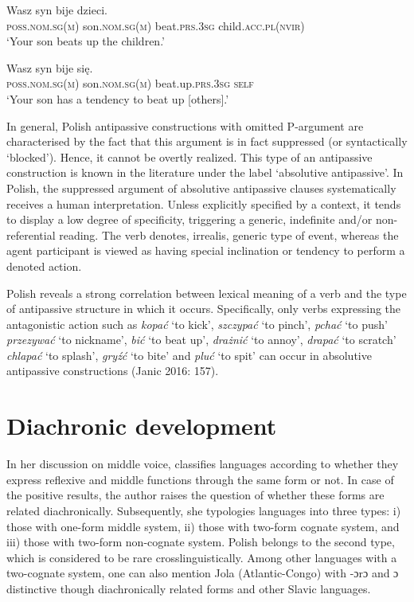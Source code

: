 \documentclass[output=paper]{langscibook}
\begin{document}
\ea \label{ex:Janic:59}
\ea \label{ex:Janic:59a}
\gll Wasz  syn bije dzieci.\\
	 \textsc{poss.nom.sg(m)} son.\textsc{nom.sg(m)}	beat.\textsc{prs.3sg}	child.\textsc{acc.pl(nvir)}\\
\glt ‘Your son beats up the children.’

\ex \label{ex:Janic:59b}
\gll Wasz  syn  bije  się.\\
 	\textsc{poss.nom.sg(m)}	 son.\textsc{nom.sg(m)}	beat.up.\textsc{prs.3sg} \textsc{self}\\
\glt ‘Your son has a tendency to beat up [others].’

\z
\z
	
In general, Polish antipassive constructions with omitted P-argument are characterised by the fact that this argument is in fact suppressed (or syntactically ‘blocked’). Hence, it cannot be overtly realized. This type of an antipassive construction is known in the literature under the label ‘absolutive antipassive’. In Polish, the suppressed argument of absolutive antipassive clauses systematically receives a human interpretation. Unless explicitly specified by a context, it tends to display a low degree of specificity, triggering a generic, indefinite and/or non-referential reading. The verb denotes, irrealis, generic type of event, whereas the agent participant is viewed as having special inclination or tendency to perform a denoted action. 

Polish reveals a strong correlation between lexical meaning of a verb and the type of antipassive structure in which it occurs. Specifically, only verbs expressing the antagonistic action such as \textit{kopać} ‘to kick’, \textit{szczypać} ‘to pinch’, \textit{pchać} ‘to push’ \textit{przezywać} ‘to nickname’, \textit{bić} ‘to beat up’, \textit{drażnić} ‘to annoy’, \textit{drapać} ‘to scratch’ \textit{chlapać} ‘to splash’, \textit{gryźć} ‘to bite’ and \textit{pluć} ‘to spit’ can occur in absolutive antipassive constructions (Janic 2016: 157).


\section{Diachronic development} \label{sec:Janic:5}

In her discussion on middle voice, \citet{Kemmer1993} classifies languages according to whether they express reflexive and middle functions through the same form or not. In case of the positive results, the author raises the question of whether these forms are related diachronically. Subsequently, she typologies languages into three types: i) those with one-form middle system, ii) those with two-form cognate system, and iii) those with two-form non-cognate system. Polish belongs to the second type, which is considered to be rare crosslinguistically. Among other languages with a two-cognate system, one can also mention Jola (Atlantic-Congo) with -ɔrɔ and ɔ distinctive though diachronically related forms and other Slavic languages. 
\end{document}

